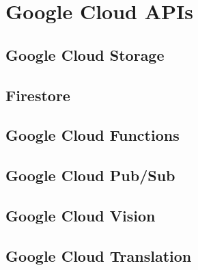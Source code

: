 \chapter{Google Cloud APIs}\label{ch:google_cloud_apis}

\section{Google Cloud Storage}\label{sec:google_cloud_storage}

\section{Firestore}\label{sec:firestore}

\section{Google Cloud Functions}\label{sec:google_cloud_functions}

\section{Google Cloud Pub/Sub}\label{sec:google_cloud_pub_sub}

\section{Google Cloud Vision}\label{sec:google_cloud_vision}

\section{Google Cloud Translation}\label{sec:google_cloud_translation}
